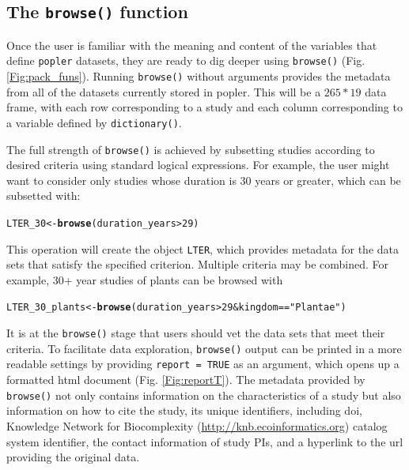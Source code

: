 \documentclass{article}\usepackage[]{graphicx}\usepackage[]{color}
\makeatletter
\newcommand{\hlnum}[1]{\textcolor[rgb]{0.686,0.059,0.569}{#1}}%
\newcommand{\hlstr}[1]{\textcolor[rgb]{0.192,0.494,0.8}{#1}}%
\newcommand{\hlopt}[1]{\textcolor[rgb]{0,0,0}{#1}}%
\newcommand{\hlstd}[1]{\textcolor[rgb]{0.345,0.345,0.345}{#1}}%
\newcommand{\hlkwb}[1]{\textcolor[rgb]{0.69,0.353,0.396}{#1}}%
\newcommand{\hlkwd}[1]{\textcolor[rgb]{0.737,0.353,0.396}{\textbf{#1}}}%
\newenvironment{kframe}{%
 \def\at@end@of@kframe{}%
 \ifinner\ifhmode%
  \def\at@end@of@kframe{\end{minipage}}%
  \begin{minipage}{\columnwidth}%
 \fi\fi%
 \def\FrameCommand##1{\hskip\@totalleftmargin \hskip-\fboxsep
 \colorbox{shadecolor}{##1}\hskip-\fboxsep
     \hskip-\linewidth \hskip-\@totalleftmargin \hskip\columnwidth}%
 \MakeFramed {\advance\hsize-\width
   \@totalleftmargin\z@ \linewidth\hsize
   \@setminipage}}%
 {\par\unskip\endMakeFramed%
 \at@end@of@kframe}
\newenvironment{knitrout}{}{} %
\makeatother
\begin{document}
\subsection*{The \texttt{browse()} function}
Once the user is familiar with the meaning and content of the variables that define \texttt{popler} datasets, they are ready to dig deeper using \texttt{browse()} (Fig. \ref{Fig:pack_funs}). Running \texttt{browse()} without arguments provides the metadata from all of the datasets currently stored in popler. This will be a $265 * 19$ data frame, with each row corresponding to a study and each column corresponding to a variable defined by \texttt{dictionary()}.

The full strength of \texttt{browse()} is achieved by subsetting studies according to desired criteria using standard logical expressions. For example, the user might want to consider only studies whose duration is 30 years or greater, which can be subsetted with:
\begin{knitrout}
\color{fgcolor}\begin{kframe}
\begin{alltt}
\hlstd{LTER_30} \hlkwb{<-} \hlkwd{browse}\hlstd{( duration_years} \hlopt{>} \hlnum{29}\hlstd{)}
\end{alltt}
\end{kframe}
\end{knitrout}
This operation will create the object \texttt{LTER}, which provides metadata for the data sets that satisfy the specified criterion. Multiple criteria may be combined. For example, 30+ year studies of plants can be browsed with
\begin{knitrout}
\color{fgcolor}\begin{kframe}
\begin{alltt}
\hlstd{LTER_30_plants} \hlkwb{<-} \hlkwd{browse}\hlstd{( duration_years} \hlopt{>} \hlnum{29} \hlopt{&} \hlstd{kingdom} \hlopt{==} \hlstr{"Plantae"}\hlstd{)}
\end{alltt}
\end{kframe}
\end{knitrout}
It is at the \texttt{browse()} stage that users should  vet the data sets that meet their criteria. To facilitate data exploration, \texttt{browse()} output can be printed in a more readable settings by providing \texttt{report = TRUE} as an argument, which opens up a formatted html document (Fig. \ref{Fig:reportT}). The metadata provided by \texttt{browse()} not only contains information on the characteristics of a study but also information on how to cite the study, its unique identifiers, including doi, Knowledge Network for Biocomplexity (\url{http://knb.ecoinformatics.org}) catalog system identifier, the contact information of study PIs, and a hyperlink to the url providing the original data.
\end{document}
